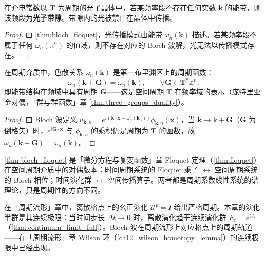 \begin{corollary}[光子带隙]\label{cor:photonic_bandgap}
在介电常数以 $\mathbf{T}$ 为周期的光子晶体中，若某频率段不存在任何实数 $\mathbf{k}$ 的能带，则该频段为\textbf{光子带隙}。带隙内的光被禁止在晶体中传播。
\end{corollary}

\begin{proof}
由 \cref{thm:bloch_floquet}，光传播模式由能带 $\omega_n(\mathbf{k})$ 描述。若某频率段不属于任何 $\omega_n(\mathbb{R}^n)$ 的值域，则不存在对应的 Bloch 波解，光无法以传播模式存在。
\end{proof}

\begin{property}[色散关系的频域支撑]\label{prop:dispersion_period}
在周期介质中，色散关系 $\omega_n(\mathbf{k})$ 是第一布里渊区上的周期函数：
\[
\omega_n(\mathbf{k}+\mathbf{G}) = \omega_n(\mathbf{k}), \qquad \forall \mathbf{G}\in\mathbf{T}^*\mathbb{Z}^n.
\]
即能带结构在频域中具有周期 $\mathbf{G}$——这是空间周期 $\mathbf{T}$ 在频率域的表示（庞特里亚金对偶，「群与群函数」章 \cref{thm:three_groups_duality}）。
\end{property}

\begin{proof}
由 Bloch 波定义 $u_{\mathbf{k},n} = e^{i(\mathbf{k}\cdot\mathbf{x}-\omega_n(\mathbf{k})t)}\phi_{\mathbf{k},n}(\mathbf{x})$，当 $\mathbf{k}\to\mathbf{k}+\mathbf{G}$（$\mathbf{G}$ 为倒格矢）时，$e^{i\mathbf{G}\cdot\mathbf{x}}$ 与 $\phi_{\mathbf{k},n}$ 的乘积仍是周期为 $\mathbf{T}$ 的函数，故 $\omega_n(\mathbf{k}+\mathbf{G}) = \omega_n(\mathbf{k})$。
\end{proof}

\begin{remark}\label{rem:propagation_floquet}
\cref{thm:bloch_floquet} 是「微分方程与复变函数」章 Floquet 定理（\cref{thm:floquet}）在空间周期介质中的对偶版本：时间周期系统的 Floquet 乘子 $\leftrightarrow$ 空间周期系统的 Bloch 相位；时间演化群 $\leftrightarrow$ 空间传播算子。两者都是周期系数线性系统的谱理论，只是周期性的方向不同。
\end{remark}

\begin{remark}\label{rem:propagation_periodic_manifold}
在「周期流形」章中，离散格点上的幺正演化 $\mathcal{U}^p=I$ 给出严格周期。本章的演化半群是其连续极限：当时间步长 $\Delta t\to 0$ 时，离散演化趋于连续演化群 $E_t = e^{tA}$（\cref{thm:continuum_limit_full}）。Bloch 波在周期流形上对应格点上的周期轨道——在「周期流形」章 Wilson 环（\cref{ch12_wilson_homotopy_lemma}）的连续极限中已经出现。
\end{remark}

